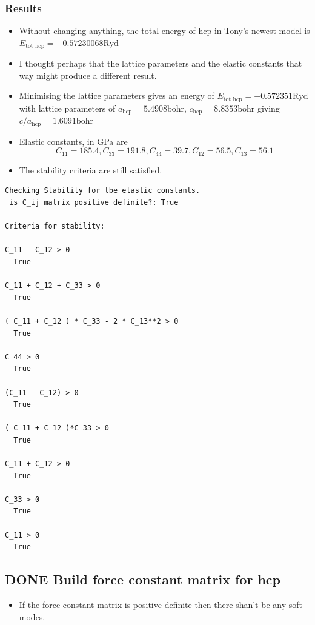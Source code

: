 \documentclass[11pt]{article}
\begin{document}
\subsubsection{Results}
\label{sec:org6115d52}
\begin{itemize}
\item Without changing anything, the total energy of hcp in Tony's newest
model is \(E_{\text{tot hcp}} = -0.57230068 \text{Ryd}\)
\item I thought perhaps that the lattice parameters and the elastic constants
that way might produce a different result.
\item Minimising the lattice parameters gives an energy of  \(E_{\text{tot
      hcp}} = -0.572351 \text{Ryd}\) with lattice parameters of
\(a_{\text{hcp}} = 5.4908 \text{bohr}\), \(c_{\text{hcp}} = 8.8353 \text{bohr}\) giving \(c/a_{\text{hcp}} = 1.6091 \text{bohr}\)
\item Elastic constants, in GPa are \[ C_{11}=185.4, C_{33}=191.8, C_{44}= 39.7, C_{12}= 56.5, C_{13}= 56.1\]
\item The stability criteria are still satisfied.
\end{itemize}
\begin{verbatim}
Checking Stability for tbe elastic constants. 
 is C_ij matrix positive definite?: True

Criteria for stability:

C_11 - C_12 > 0 
  True

C_11 + C_12 + C_33 > 0 
  True

( C_11 + C_12 ) * C_33 - 2 * C_13**2 > 0 
  True

C_44 > 0 
  True

(C_11 - C_12) > 0
  True

( C_11 + C_12 )*C_33 > 0 
  True

C_11 + C_12 > 0
  True

C_33 > 0
  True

C_11 > 0
  True

\end{verbatim}
\subsection{{\bfseries\sffamily DONE} Build force constant matrix for hcp}
\label{sec:org343444d}
\begin{itemize}
\item If the force constant matrix is positive definite then there shan't be
any soft modes.
\end{itemize}
\end{document}
